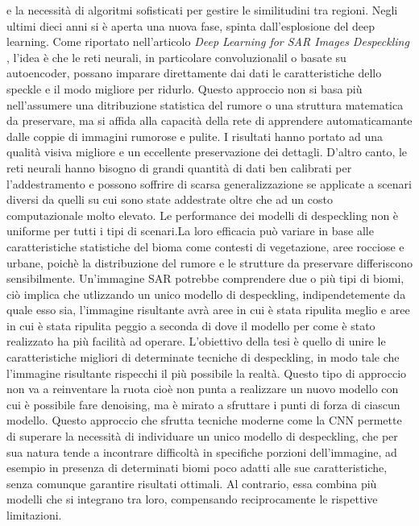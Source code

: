 e la necessità di algoritmi sofisticati per gestire le similitudini tra regioni. Negli ultimi dieci 
anni si è aperta una nuova fase, spinta dall'esplosione del deep learning. Come riportato nell'articolo 
\textit{Deep Learning for SAR Images Despeckling} \cite{DL_SAR}, l'idea è che le reti neurali, in 
particolare convoluzionalil o basate su autoencoder, possano imparare direttamente dai dati le caratteristiche
dello speckle e il modo migliore per ridurlo. Questo approccio non si basa più nell'assumere una ditribuzione 
statistica del rumore o una struttura matematica da preservare, ma si affida alla capacità della rete di 
apprendere automaticamante dalle coppie di immagini rumorose e pulite. I risultati hanno portato ad una qualità 
visiva migliore e un eccellente preservazione dei dettagli. D'altro canto, le reti neurali hanno bisogno 
di grandi quantità di dati ben calibrati per l'addestramento e possono soffrire di scarsa generalizzazione se 
applicate a scenari diversi da quelli su cui sono state addestrate oltre che ad un costo computazionale molto elevato. 
Le performance dei modelli di despeckling non è uniforme per tutti i tipi di scenari.La loro efficacia può variare
in base alle caratteristiche statistiche del bioma come contesti di vegetazione, aree rocciose e urbane, 
poichè la distribuzione del rumore e le strutture da preservare differiscono sensibilmente. Un'immagine SAR potrebbe 
comprendere due o più tipi di biomi, ciò implica che utlizzando un unico modello di despeckling, 
indipendetemente da quale esso sia, l'immagine risultante avrà aree in cui è stata ripulita meglio e aree in cui è 
stata ripulita peggio a seconda di dove il modello per come è stato realizzato ha più facilità ad operare.
L'obiettivo della tesi è quello di unire le caratteristiche migliori di determinate tecniche di despeckling, 
in modo tale che l'immagine risultante rispecchi il più possibile la realtà. Questo tipo di approccio non va a 
reinventare la ruota cioè non punta a realizzare un nuovo modello con cui è possibile fare denoising, ma è mirato
a sfruttare i punti di forza di ciascun modello. Questo approccio che sfrutta tecniche moderne come la CNN permette di superare la necessità di individuare un unico 
modello di despeckling, che per sua natura tende a incontrare difficoltà in specifiche porzioni dell’immagine, ad 
esempio in presenza di determinati biomi poco adatti alle sue caratteristiche, senza comunque garantire risultati 
ottimali. Al contrario, essa combina più modelli che si integrano tra loro, compensando reciprocamente le rispettive 
limitazioni.